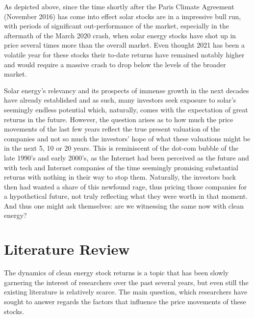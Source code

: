 \documentclass[11pt]{article}
\begin{document}
As depicted above, since the time shortly after the Paris Climate Agreement (November 2016) has come into effect solar stocks are in a impressive bull run, with periods of significant out-performance of the market, especially in the aftermath of the March 2020 crash, when solar energy stocks have shot up in price several times more than the overall market. Even thought 2021 has been a volatile year for these stocks their to-date returns have remained notably higher and would require a massive crash to drop below the levels of the broader market.
\newline

Solar energy's relevancy and its prospects of immense growth in the next decades have already established  and as such, many investors seek exposure to solar's seemingly endless potential which, naturally, comes with the expectation of great returns in the future. However, the question arises as to how much the price movements of the last few years reflect the true present valuation of the companies and not so much the investors' hope of what these valuations might be in the next 5, 10 or 20 years. This is reminiscent of the dot-com bubble of the late 1990's and early 2000's, as the Internet had been perceived as the future and with tech and Internet companies of the time seemingly promising substantial returns with nothing in their way to stop them. Naturally, the investors back then had wanted a share of this newfound rage, thus pricing those companies for a hypothetical future, not truly reflecting what they were worth in that moment. And thus one might ask themselves: are we witnessing the same now with clean energy?

\newpage

\section{Literature Review}

The dynamics of clean energy stock returns is a topic that has been slowly garnering the interest of researchers over the past several years, but even still the existing literature is relatively scarce. The main question, which researchers have sought to answer regards the factors that influence the price movements of these stocks.
\newline
\end{document}
